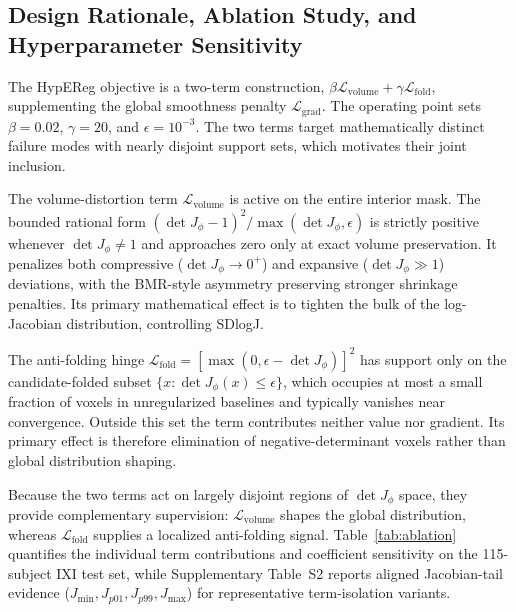 \documentclass[jimaging,article,submit,pdftex,moreauthors]{Definitions/mdpi}
\begin{document}
\subsection{Design Rationale, Ablation Study, and Hyperparameter Sensitivity}\label{sec:hypereg_roles}
The HypEReg objective is a two-term construction, \(\beta\mathcal{L}_{\mathrm{volume}}+\gamma\mathcal{L}_{\mathrm{fold}}\), supplementing the global smoothness penalty \(\mathcal{L}_{\mathrm{grad}}\). The operating point sets \(\beta=0.02\), \(\gamma=20\), and \(\epsilon=10^{-3}\). The two terms target mathematically distinct failure modes with nearly disjoint support sets, which motivates their joint inclusion.

The volume-distortion term \(\mathcal{L}_{\mathrm{volume}}\) is active on the entire interior mask. The bounded rational form \((\det J_\phi-1)^2/\max(\det J_\phi,\epsilon)\) is strictly positive whenever \(\det J_\phi \neq 1\) and approaches zero only at exact volume preservation. It penalizes both compressive (\(\det J_\phi\to 0^+\)) and expansive (\(\det J_\phi\gg 1\)) deviations, with the BMR-style asymmetry preserving stronger shrinkage penalties. Its primary mathematical effect is to tighten the bulk of the log-Jacobian distribution, controlling SDlogJ.

The anti-folding hinge \(\mathcal{L}_{\mathrm{fold}}=[\max(0,\epsilon-\det J_\phi)]^2\) has support only on the candidate-folded subset \(\{x:\det J_\phi(x)\le\epsilon\}\), which occupies at most a small fraction of voxels in unregularized baselines and typically vanishes near convergence. Outside this set the term contributes neither value nor gradient. Its primary effect is therefore elimination of negative-determinant voxels rather than global distribution shaping.

Because the two terms act on largely disjoint regions of \(\det J_\phi\) space, they provide complementary supervision: \(\mathcal{L}_{\mathrm{volume}}\) shapes the global distribution, whereas \(\mathcal{L}_{\mathrm{fold}}\) supplies a localized anti-folding signal. Table~\ref{tab:ablation} quantifies the individual term contributions and coefficient sensitivity on the 115-subject IXI test set, while Supplementary Table~S2 reports aligned Jacobian-tail evidence (\(J_{\min},J_{p01},J_{p99},J_{\max}\)) for representative term-isolation variants.
\end{document}
